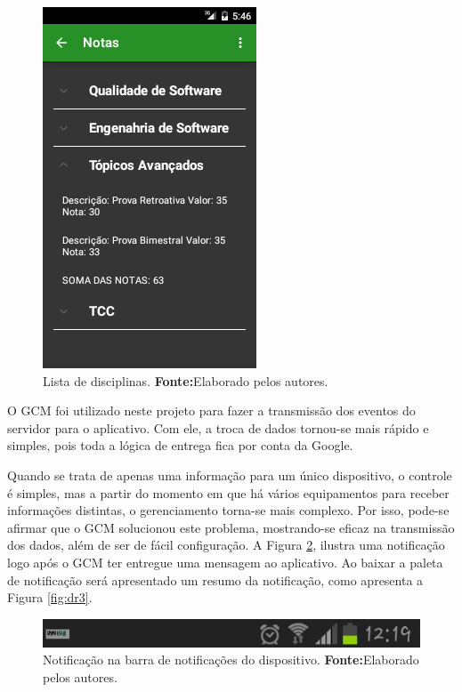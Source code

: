 \begin{figure}[h!]
	\centerline{\includegraphics[scale=0.8]{./imagens/3_discussao_resultados/dr1.png}}
	\caption[Lista de disciplinas]{Lista de disciplinas.
		\textbf{Fonte:}Elaborado pelos autores.}
	\label{fig:dr1}
\end{figure}

	\pagebreak

	\par O GCM foi utilizado neste projeto para fazer a transmissão dos eventos do
servidor para o aplicativo. Com ele, a troca de dados tornou-se mais rápido e
simples, pois toda a lógica de entrega fica por conta da Google.

	\par Quando se trata de apenas uma informação para um único dispositivo, o
controle é simples, mas a partir do momento em que há vários equipamentos para
receber informações distintas, o gerenciamento torna-se mais complexo. Por
isso, pode-se afirmar que o GCM solucionou este problema, mostrando-se eficaz
na transmissão dos dados, além de ser de fácil configuração. A Figura
\ref{fig:dr2}, ilustra uma notificação logo após o GCM ter entregue uma
mensagem ao aplicativo. Ao baixar a paleta de notificação será apresentado um
resumo da notificação, como apresenta a Figura \ref{fig:dr3}.


\begin{figure}[h!]
	\centerline{\includegraphics[scale=0.8]{./imagens/3_discussao_resultados/dr2.png}}
	\caption[Notificação na barra de notificações do dispositivo.]{Notificação na
	barra de notificações do dispositivo.
	\textbf{Fonte:}Elaborado pelos autores.}
	\label{fig:dr2}
\end{figure}



